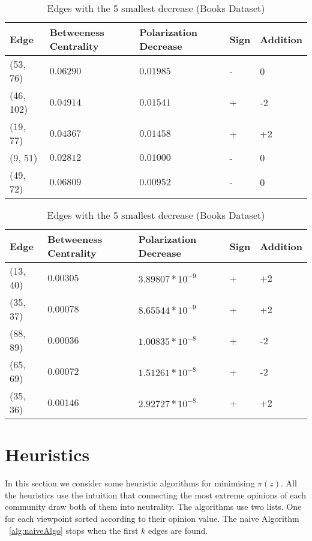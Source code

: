 \begin{table}[htbp]
 \centering
 \caption{Edges with the 5 largest decrease (Books Dataset)}
 \label{tab:edgesLargest}
 \begin{tabular}{| l || l | l | l | l |}
 \hline
  Edge & Betweeness Centrality & Polarization Decrease & Sign & Addition\\
  \hline
  \hline
  (53, 76) & $0.06290$ & $0.01985$ & - &  0\\
  \hline
  (46, 102) & $0.04914$ & $0.01541$ & + &  -2\\
  \hline
  (19, 77) & $0.04367$ & $0.01458$ & + &  +2\\
  \hline
  (9, 51) & $0.02812$ & $0.01000$ & - &  0\\
  \hline
  (49, 72) & $0.06809$ & $0.00952$ & - &  0\\
  \hline
 \end{tabular}
 
 
 \caption{Edges with the 5 smallest decrease (Books Dataset)}
 \label{tab:edgesLargest}
 \begin{tabular}{| l || l | l | l | l |}
 \hline
  Edge & Betweeness Centrality & Polarization Decrease & Sign & Addition\\
  \hline
  \hline
  (13, 40) & $0.00305$ & $3.89807*10^{-9}$ & + &  +2\\
  \hline
  (35, 37) & $0.00078$ & $8.65544*10^{-9}$ & + &  +2\\
  \hline
  (88, 89) & $0.00036$ & $1.00835*10^{-8}$ & + &  -2\\
  \hline
  (65, 69) & $0.00072$ & $1.51261*10^{-8}$ & + &  -2\\
  \hline
  (35, 36) & $0.00146$ & $2.92727*10^{-8}$ & + &  +2\\
  \hline
  \hline
 \end{tabular}
 
\end{table}

\clearpage

\section{Heuristics}
\label{sec:heuristics}

In this section we  consider some heuristic algorithms for minimising $\pi(z)$. All the heuristics use the intuition that connecting the most extreme opinions of each community draw both of them into neutrality. The algorithms use two lists. One for each viewpoint sorted according to their opinion value. The naive Algorithm ~\ref{alg:naiveAlgo} stops when the first $k$ edges are found.

